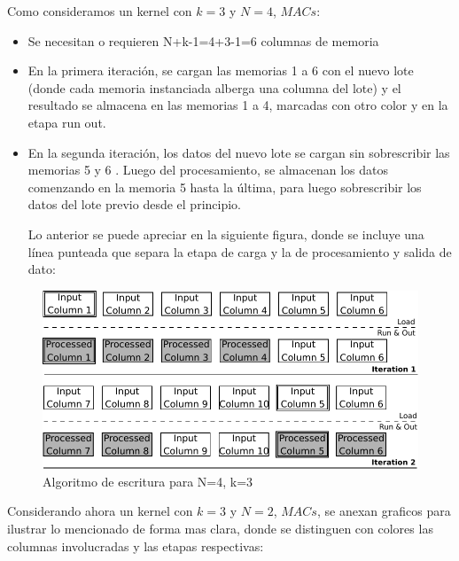 \documentclass[]{IEEEphot}
\begin{document}
Como consideramos un kernel con $k=3$ y $N=4$, $MACs$:
\begin{frame}{}
	    
      \begin{itemize}
        \item Se necesitan o requieren N+k-1=4+3-1=6 columnas de memoria
	\item En la primera iteración, se cargan las memorias 1 a 6 con el nuevo lote (donde cada memoria instanciada alberga una columna del lote) y el resultado se almacena en las memorias 1 a 4, marcadas con otro color y en la etapa run  out.
	\item En la segunda iteración, los datos del nuevo lote se cargan sin sobrescribir las memorias 5 y 6 . Luego del procesamiento, se almacenan los datos comenzando en la memoria  5 hasta la última, para luego sobrescribir los datos del lote previo desde el principio.

\bigskip
\bigskip
Lo anterior se puede apreciar en la siguiente figura, donde se incluye una línea punteada que separa la etapa de carga y la de procesamiento y salida de dato:

\end{itemize}
\end{frame}

\begin{figure}[H]
\centering
\includegraphics[scale=0.8]{algorithm}
\caption{Algoritmo de escritura para N=4, k=3 }
\label{writingprocess1}
\end{figure}


\bigskip

Considerando ahora un kernel con $k=3$ y  $N=2$, $MACs$, se anexan graficos para ilustrar lo mencionado de forma mas clara, 
donde se distinguen con colores las columnas involucradas y las etapas respectivas:
\end{document}
